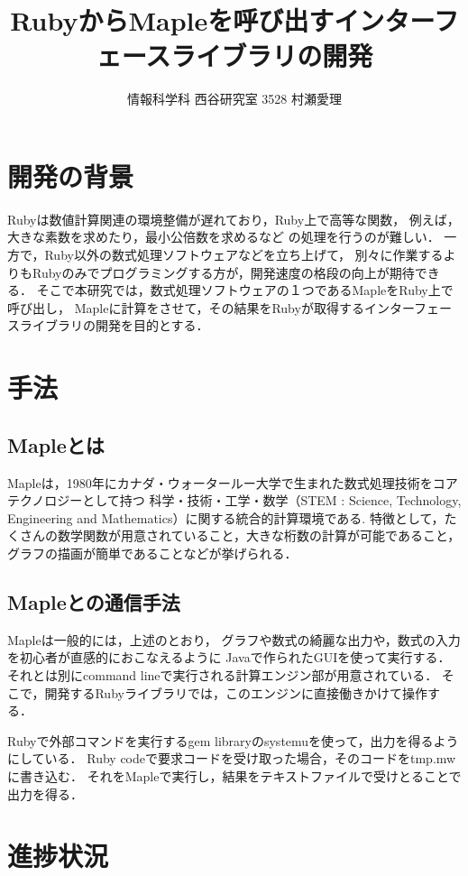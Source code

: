 \documentclass[10pt,a4j,twocolumn]{jsarticle}
\begin{document}
\title{RubyからMapleを呼び出すインターフェースライブラリの開発}
\author{情報科学科 西谷研究室 3528 村瀬愛理}
\date{}
\maketitle
\section{開発の背景}
Rubyは数値計算関連の環境整備が遅れており，Ruby上で高等な関数，
例えば，大きな素数を求めたり，最小公倍数を求めるなど
の処理を行うのが難しい．
一方で，Ruby以外の数式処理ソフトウェアなどを立ち上げて，
別々に作業するよりもRubyのみでプログラミングする方が，開発速度の格段の向上が期待できる．
そこで本研究では，数式処理ソフトウェアの１つであるMapleをRuby上で呼び出し，
Mapleに計算をさせて，その結果をRubyが取得するインターフェースライブラリの開発を目的とする．

\section{手法}
\subsection{Mapleとは}
Mapleは，1980年にカナダ・ウォータールー大学で生まれた数式処理技術をコアテクノロジーとして持つ
科学・技術・工学・数学（STEM : Science, Technology, Engineering and Mathematics）に関する統合的計算環境である\cite{Maple}.
特徴として，たくさんの数学関数が用意されていること，大きな桁数の計算が可能であること，グラフの描画が簡単であることなどが挙げられる．

\subsection{Mapleとの通信手法}
Mapleは一般的には，上述のとおり，
グラフや数式の綺麗な出力や，数式の入力を初心者が直感的におこなえるように
Javaで作られたGUIを使って実行する．
それとは別にcommand lineで実行される計算エンジン部が用意されている．
そこで，開発するRubyライブラリでは，このエンジンに直接働きかけて操作する．

Rubyで外部コマンドを実行するgem libraryのsystemuを使って，出力を得るようにしている．
Ruby codeで要求コードを受け取った場合，そのコードをtmp.mwに書き込む．
それをMapleで実行し，結果をテキストファイルで受けとることで出力を得る．

\section{進捗状況}
\end{document}
